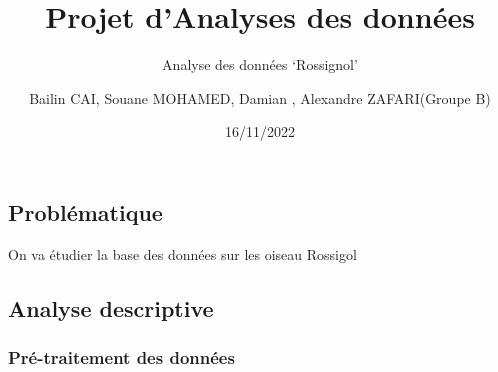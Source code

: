 \documentclass[
]{article}
\title{Projet d'Analyses des données}
\subtitle{Analyse des données `Rossignol'}
\author{Bailin CAI, Souane MOHAMED, Damian , Alexandre ZAFARI(Groupe B)}
\date{16/11/2022}
\begin{document}
\maketitle

{
\hypersetup{linkcolor=}
\setcounter{tocdepth}{4}
\tableofcontents
}
\hypertarget{probluxe9matique}{%
\subsection{Problématique}\label{probluxe9matique}}

On va étudier la base des données sur les oiseau Rossigol

\hypertarget{analyse-descriptive}{%
\subsection{Analyse descriptive}\label{analyse-descriptive}}

\hypertarget{pruxe9-traitement-des-donnuxe9es}{%
\subsubsection{Pré-traitement des
données}\label{pruxe9-traitement-des-donnuxe9es}}
\end{document}
